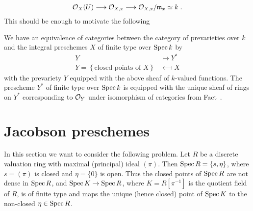 \documentclass[a4paper,parskip=half,numbers=enddot, DIV=12]{scrreprt}
\begin{document}
\begin{align*}
    \Oo_X(U)\morphism \Oo_{X,x} \morphism \Oo_{X,x}/\mm_x \simeq k\;.
\end{align*}
This should be enough to motivate the following
\begin{thm}
    We have an equivalence of categories between the category of prevarieties over $k$ and the integral preschemes $X$ of finite type over $\operatorname{Spec} k$ by
    \begin{align*}
        Y &\longmapsto Y^*\\
        Y = \left\{\text{closed points of } X\right\} &\longmapsfrom X
    \end{align*}
    with the prevariety $Y$ equipped with the above sheaf of $k$-valued functions. The prescheme $Y^*$ of finite type over $\operatorname{Spec} k$ is equipped with the unique sheaf of rings on $Y^*$ corresponding to $\mathcal{O}_Y$ under isomorphism of categories from Fact~.
\end{thm}
\section{Jacobson preschemes}

In this section we want to consider the following problem. Let $R$ be a discrete valuation ring with maximal (principal) ideal $(\pi)$. Then $\operatorname{Spec} R = \{s,\eta\}$, where $s= (\pi)$ is closed and $\eta = \{0\}$ is open. Thus the closed points of $\operatorname{Spec} R$ are not dense in $\operatorname{Spec} R$, and $\Spec K \morphism \Spec R$, where $K= R[\pi^{-1}]$ is the quotient field of $R$, is of finite type and maps the unique (hence closed) point of $\operatorname{Spec} K$ to the non-closed $\eta\in \operatorname{Spec} R$.
\end{document}
